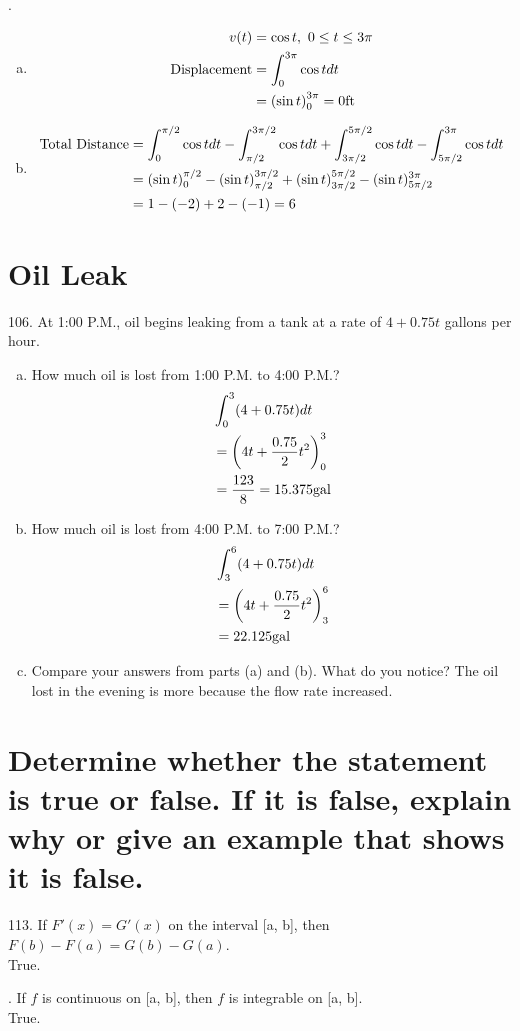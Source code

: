 \documentclass[11pt]{article}
\newcommand*{\vs}{\vspace{1cm}}
\newcommand*{\next}{\noindent}
\newcommand*{\set}{\setcounter{equation}{0}}
\newcommand*{\lt}{\left}
\newcommand*{\rt}{\right}
\begin{document}
\vs\next
102.\begin{enumerate}[(a)]
    \item\begin{align}
        \set
        v(t)&=\cos t,\,\, 0\leq t\leq 3\pi\\
        \text{Displacement}&=\int_{0}^{3\pi}\cos tdt\\
        &=\lt(\sin t\rt)_0^{3\pi}=0\text{ft}\\
    \end{align}
    \item\begin{align}
        \set
        \text{Total Distance}&=\int_{0}^{\pi/2}\cos tdt-\int_{\pi/2}^{3\pi/2}\cos tdt+\int_{3\pi/2}^{5\pi/2}\cos tdt-\int_{5\pi/2}^{3\pi}\cos tdt\\
        &=(\sin t)_0^{\pi/2}-(\sin t)_{\pi/2}^{3\pi/2}+(\sin t)_{3\pi/2}^{5\pi/2}-(\sin t)_{5\pi/2}^{3\pi}\\
        &=1-(-2)+2-(-1)=6
    \end{align}
\end{enumerate}

\section{Oil Leak}
106. At 1:00 P.M., oil begins leaking from a tank at a
rate of $4+0.75t$ gallons per hour.
\begin{enumerate}[(a)]
    \item How much oil is lost from 1:00 P.M. to 4:00 P.M.?
        \begin{align}
            \set
            &\int_{0}^{3}(4+0.75t)dt\\
            &=\lt(4t+\frac{0.75}{2}t^2\rt)_0^3\\
            &=\frac{123}{8}=15.375\text{gal}
        \end{align}
    \item How much oil is lost from 4:00 P.M. to 7:00 P.M.?
        \begin{align}
            \set
            &\int_{3}^{6}(4+0.75t)dt\\
            &=\lt(4t+\frac{0.75}{2}t^2\rt)_3^6\\
            &=22.125\text{gal}
        \end{align}
    \item Compare your answers from parts (a) and (b). What do
    you notice?
        \indent The oil lost in the evening is more because the flow rate increased.    
\end{enumerate}

\section{Determine whether
the statement is true or false. If it is false, explain why or give
an example that shows it is false.}
113. If $F'(x)=G'(x)$ on the interval [a, b], then $F(b)-F(a)=G(b)-G(a)$.\\
\indent True.

\vs\next
114. If $f$ is continuous on [a, b], then $f$ is integrable on [a, b].\\
\indent True.
\end{document}

